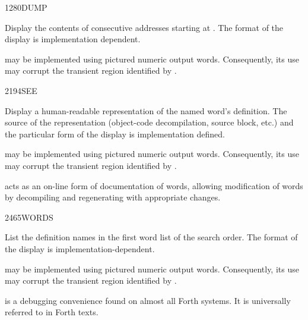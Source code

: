 \vspace*{-2.5ex}
\begin{worddef}{1280}{DUMP}
\item {}

	Display the contents of  consecutive addresses starting
	at . The format of the display is implementation
	dependent.

	 may be implemented using pictured numeric output
	words. Consequently, its use may corrupt the transient region
	identified by .

\end{worddef}

\vspace*{-2.5ex}
\begin{worddef}{2194}{SEE}
\item {}

	Display a human-readable representation of the named word's
	definition. The source of the representation (object-code
	decompilation, source block, etc.) and the particular form of
	the display is implementation defined.

	 may be implemented using pictured numeric output
	words. Consequently, its use may corrupt the transient region
	identified by .


	\begin{rationale} %
		 acts as an on-line form of documentation of
		words, allowing modification of words by decompiling and
		regenerating with appropriate changes.
	\end{rationale}
\end{worddef}


\begin{worddef}{2465}{WORDS}
\item \stack{}{}

	List the definition names in the first word list of the search
	order. The format of the display is implementation-dependent.

	 may be implemented using pictured numeric output
	words. Consequently, its use may corrupt the transient region
	identified by .


	\begin{rationale} %
		 is a debugging convenience found on almost
		all Forth systems. It is universally referred to in Forth texts.
	\end{rationale}
\end{worddef}


